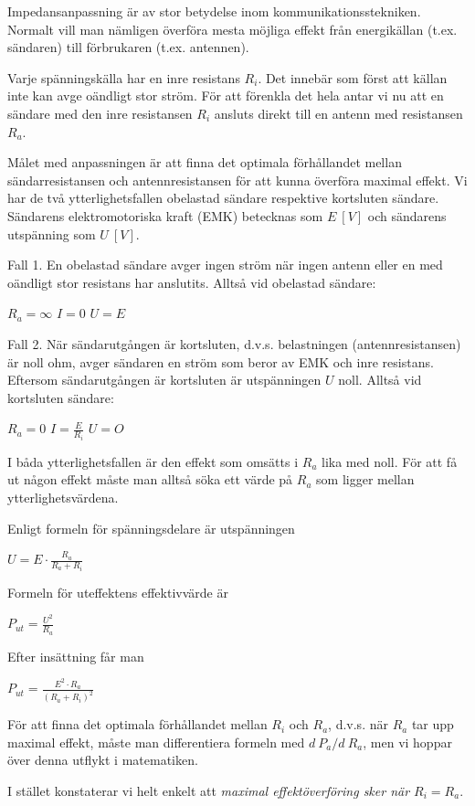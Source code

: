 Impedansanpassning är av stor betydelse inom kommunikationsstekniken.
Normalt vill man nämligen överföra mesta möjliga effekt från energikällan
(t.ex. sändaren) till förbrukaren (t.ex. antennen).

Varje spänningskälla har en inre resistans \(R_i\). Det innebär som först att
källan inte kan avge oändligt stor ström. För att förenkla det hela antar vi nu
att en sändare med den inre resistansen \(R_i\) ansluts direkt till en antenn
med resistansen \(R_a\).

Målet med anpassningen är att finna det optimala förhållandet mellan
sändarresistansen och antennresistansen för att kunna överföra maximal effekt.
Vi har de två ytterlighetsfallen obelastad sändare respektive kortsluten
sändare. Sändarens elektromotoriska kraft (EMK) betecknas som \(E\ [V]\) och
sändarens utspänning som \(U\ [V]\).

Fall 1.
En obelastad sändare avger ingen ström när ingen antenn eller en med oändligt
stor resistans har anslutits.
Alltså vid obelastad sändare:

\(R_a = \infty\) \(I = 0\) \(U = E\)

Fall 2.
När sändarutgången är kortsluten, d.v.s. belastningen (antennresistansen) är
noll ohm, avger sändaren en ström som beror av EMK och inre resistans. Eftersom
sändarutgången är kortsluten är utspänningen \(U\) noll.
Alltså vid kortsluten sändare:

\(R_a = 0\) \(I = \frac{E}{R_i}\) \(U = O\)

I båda ytterlighetsfallen är den effekt som omsätts i \(R_a\) lika med noll.
För att få ut någon effekt måste man alltså söka ett värde på \(R_a\) som
ligger mellan ytterlighetsvärdena.

Enligt formeln för spänningsdelare är utspänningen

\(U = E \cdot \frac{R_a}{R_a+R_i}\)

Formeln för uteffektens effektivvärde är

\(P_{ut} = \frac{U^2}{R_a}\)

Efter insättning får man

\(P_{ut} = \frac{E^2 \cdot R_a}{(R_a + R_i)^2}\)

För att finna det optimala förhållandet mellan \(R_i\) och \(R_a\), d.v.s. när
\(R_a\) tar upp maximal effekt, måste man differentiera formeln med \(d\ P_a/d\ R_a\), men vi hoppar över denna utflykt i matematiken.

I stället konstaterar vi helt enkelt att \emph{maximal effektöverföring sker när
\(R_i = R_a\)}.

